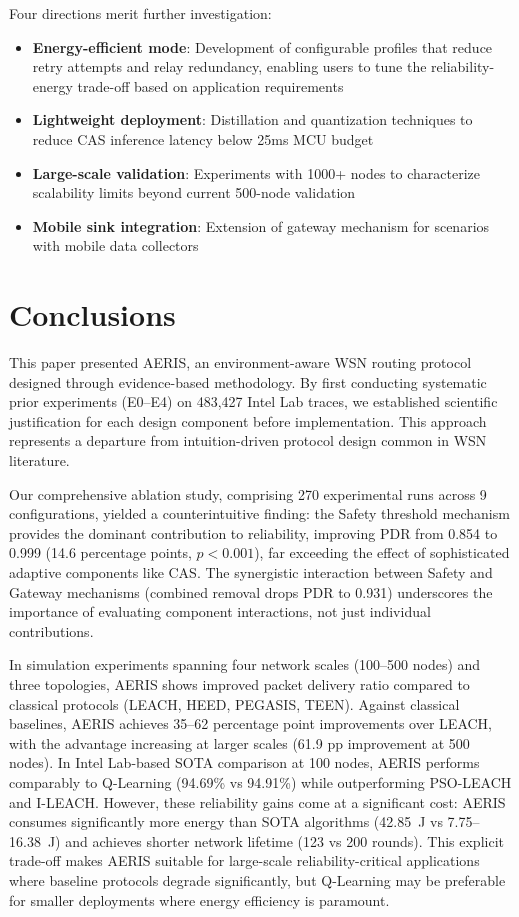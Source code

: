 \documentclass[sensors,article,submit,moreauthors,pdftex]{Definitions/mdpi}
\begin{document}
Four directions merit further investigation:
\begin{itemize}
\item \textbf{Energy-efficient mode}: Development of configurable profiles that reduce retry attempts and relay redundancy, enabling users to tune the reliability-energy trade-off based on application requirements
\item \textbf{Lightweight deployment}: Distillation and quantization techniques to reduce CAS inference latency below 25ms MCU budget
\item \textbf{Large-scale validation}: Experiments with 1000+ nodes to characterize scalability limits beyond current 500-node validation
\item \textbf{Mobile sink integration}: Extension of gateway mechanism for scenarios with mobile data collectors
\end{itemize}

\section{Conclusions}\label{sec:conclusion}

This paper presented AERIS, an environment-aware WSN routing protocol designed through evidence-based methodology. By first conducting systematic prior experiments (E0--E4) on 483,427 Intel Lab traces, we established scientific justification for each design component before implementation. This approach represents a departure from intuition-driven protocol design common in WSN literature.

Our comprehensive ablation study, comprising 270 experimental runs across 9 configurations, yielded a counterintuitive finding: the Safety threshold mechanism provides the dominant contribution to reliability, improving PDR from 0.854 to 0.999 (14.6 percentage points, $p < 0.001$), far exceeding the effect of sophisticated adaptive components like CAS. The synergistic interaction between Safety and Gateway mechanisms (combined removal drops PDR to 0.931) underscores the importance of evaluating component interactions, not just individual contributions.

In simulation experiments spanning four network scales (100--500 nodes) and three topologies, AERIS shows improved packet delivery ratio compared to classical protocols (LEACH, HEED, PEGASIS, TEEN). Against classical baselines, AERIS achieves 35--62 percentage point improvements over LEACH, with the advantage increasing at larger scales (61.9 pp improvement at 500 nodes). In Intel Lab-based SOTA comparison at 100 nodes, AERIS performs comparably to Q-Learning (94.69\% vs 94.91\%) while outperforming PSO-LEACH and I-LEACH. However, these reliability gains come at a significant cost: AERIS consumes significantly more energy than SOTA algorithms (42.85~J vs 7.75--16.38~J) and achieves shorter network lifetime (123 vs 200 rounds). This explicit trade-off makes AERIS suitable for large-scale reliability-critical applications where baseline protocols degrade significantly, but Q-Learning may be preferable for smaller deployments where energy efficiency is paramount.
\end{document}
